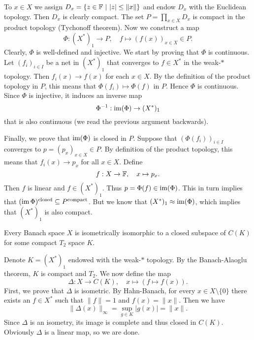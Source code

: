 \begin{myproof}
    To $x \in X$ we assign $D_x = \{z \in \mathbb {F}\ |\ |z| \leq \| x\|\}$
    and endow $D_x$ with the Euclidean topology. Then $D_x$ is clearly compact.
    The set $P = \prod_{x \in X} D_x$ is compact in the product topology (Tychonoff theorem).
    Now we construct a map 
    $$\Phi: (X^*)_1 \to P,\quad f \mapsto (f(x))_{x \in X} \in P.$$
    Clearly, $\Phi$ is well-defined and injective. We start by proving that $\Phi$ is continuous.
    Let $(f_i)_{i \in I}$ be a net in $(X^*)_1$ that converges to $f \in X^*$
    in the weak-$*$ topology. Then $f_i(x) \to f(x)$ for each $x \in X$.
    By the definition of the product topology in $P$, this means that $\Phi(f_i) \mapsto \Phi(f)$ in $P$.
    Hence $\Phi$ is continuous. Since $\Phi$ is injective, it induces an inverse map 
    $$\Phi^{-1}: \operatorname{im} (\Phi) \to (X^*)_1$$
    that is also continuous (we read the previous argument backwards).

    Finally, we prove that $\operatorname{im}(\Phi)$ is closed in $P$. Suppose that $(\Phi(f_i))_{i \in I}$ converges to 
    $p = (p_x)_{x \in X} \in P$. By definition of the product topology, this means that $f_i (x) \to p_x$
    for all $x \in X$. Define $$f: X \to \mathbb {F},\quad x \mapsto p_x.$$
    Then $f$ is linear and $f \in (X^*)_1$. Thus $p = \Phi(f) \in \operatorname{im} (\Phi)$.
    This in turn implies that $(\operatorname{im} \Phi)^{\textrm{closed}} \subseteq P^{\textrm{compact}}$.
    But we know that $(X^*)_1 \approx \operatorname{im} (\Phi)$, which implies that $(X^*)_1$ is also compact.
\end{myproof}

\begin{corollary}
    Every Banach space $X$ is isometrically isomorphic to a closed subspace 
    of $C (K)$ for some compact $T_2$ space $K$.
\end{corollary}

\begin{myproof}
    Denote $K = (X^*)_1$ endowed with the weak-$*$ topology. By the Banach-Alaoglu theorem, $K$ is compact and $T_2$.
    We now define the map $$\Delta: X \to C(K),\quad x \mapsto (f \mapsto f(x)).$$
    First, we prove that $\Delta$ is isometric. By Hahn-Banach, for every $x \in X \setminus\{0\}$ there exists an $f \in X^*$
    such that $\|f\| = 1$ and $f(x) = \|x\|$. Then we have
    \begin{equation*}
        \| \Delta (x)\|_{\infty} = \sup_{g \in K} |g(x)| = \|x\|.
    \end{equation*} 
    Since $\Delta$ is an isometry, its image is complete and thus closed in $C(K)$.
    Obviously $\Delta$ is a linear map, so we are done.
\end{myproof}

